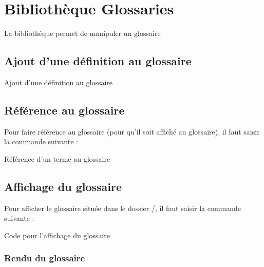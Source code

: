 \chapter{Bibliothèque Glossaries}
\label{addDef}
La bibliothèque  permet de manipuler un glossaire


\section{Ajout d'une définition au glossaire}

\begin{Latex}{Ajout d'une définition au glossaire}
\end{Latex}

\section{Référence au glossaire}

Pour faire référence au glossaire (pour qu'il soit affiché au glossaire), il faut saisir la commande suivante : \\
\begin{Latex}{Référence d'un terme au glossaire}
\end{Latex}


\section{Affichage du glossaire}

Pour afficher le glossaire située dans le dossier /, il faut saisir la commande suivante : \\

\begin{Latex}{Code pour l'affichage du glossaire}
\end{Latex}

\subsection{Rendu du glossaire}

